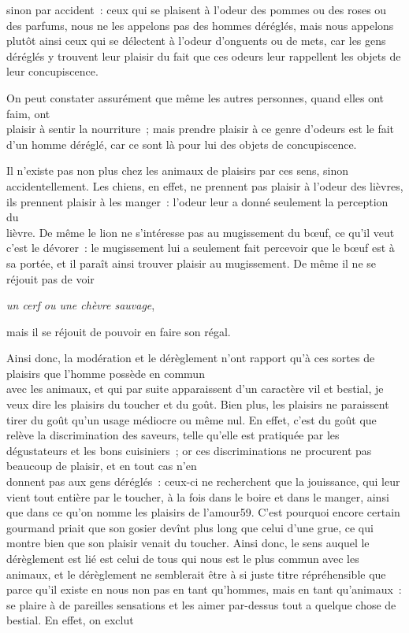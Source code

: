 \documentclass[french,twoside]{book} %
\begin{document}
sinon par accident : ceux qui se plaisent à l’odeur des pommes ou des roses ou des parfums, nous ne les appelons pas des hommes déréglés, mais nous appelons plutôt ainsi ceux qui se délectent à l’odeur d’onguents ou de mets, car les gens déréglés y trouvent leur plaisir du fait que ces odeurs leur rappellent les objets de leur concupiscence.\par
On peut constater assurément que même les autres personnes, quand elles ont faim, ont \\
plaisir à sentir la nourriture ; mais prendre plaisir à ce genre d’odeurs est le fait d’un homme déréglé, car ce sont là pour lui des objets de concupiscence.\par
Il n’existe pas non plus chez les animaux de plaisirs par ces sens, sinon accidentellement. Les chiens, en effet, ne prennent pas plaisir à l’odeur des lièvres, ils prennent plaisir à les manger : l’odeur leur a donné seulement la perception du \\
lièvre. De même le lion ne s’intéresse pas au mugissement du bœuf, ce qu’il veut c’est le dévorer : le mugissement lui a seulement fait percevoir que le bœuf est à sa portée, et il paraît ainsi trouver plaisir au mugissement. De même il ne se réjouit pas de voir\par
{\itshape un cerf ou une chèvre sauvage}, \par
mais il se réjouit de pouvoir en faire son régal.\par
Ainsi donc, la modération et le dérèglement n’ont rapport qu’à ces sortes de plaisirs que l’homme possède en commun \\
avec les animaux, et qui par suite apparaissent d’un caractère vil et bestial, je veux dire les plaisirs du toucher et du goût. Bien plus, les plaisirs ne paraissent tirer du goût qu’un usage médiocre ou même nul. En effet, c’est du goût que relève la discrimination des saveurs, telle qu’elle est pratiquée par les dégustateurs et les bons cuisiniers ; or ces discriminations ne procurent pas beaucoup de plaisir, et en tout cas n’en \\
donnent pas aux gens déréglés : ceux-ci ne recherchent que la jouissance, qui leur vient tout entière par le toucher, à la fois dans le boire et dans le manger, ainsi que dans ce qu’on nomme les plaisirs de l’amour59. C’est pourquoi encore certain gourmand priait que son gosier devînt plus long que celui d’une grue, ce qui montre bien que son plaisir venait du toucher.  Ainsi donc, le sens auquel le dérèglement est lié est celui de tous qui nous est le plus commun avec les animaux, et le dérèglement ne semblerait être à si juste titre répréhensible que parce qu’il existe en nous non pas en tant qu’hommes, mais en tant qu’animaux : se plaire à de pareilles sensations et les aimer par-dessus tout a quelque chose de bestial. En effet, on exclut \\
\end{document}
